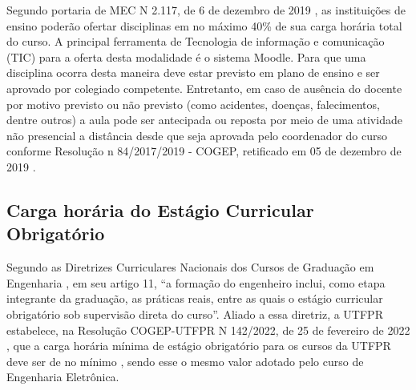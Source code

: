 

Segundo portaria de MEC N\textordmasculine{} 2.117, de 6 de dezembro de 2019 \cite{portaria2117mec}, as instituições de ensino poderão ofertar disciplinas em no máximo 40\% de sua carga horária total do curso. A principal ferramenta de Tecnologia de informação e comunicação (TIC) para a oferta desta modalidade é o sistema Moodle. Para que uma disciplina ocorra desta maneira deve estar previsto em plano de ensino e ser aprovado por colegiado competente. Entretanto, em caso de ausência do docente por motivo previsto ou não previsto (como acidentes, doenças, falecimentos, dentre outros) a aula pode ser antecipada ou reposta por meio de uma atividade não presencial a distância desde que seja aprovada pelo coordenador do curso conforme Resolução n\textordmasculine{} 84/2017/2019 - COGEP, retificado em 05 de dezembro de 2019 \cite{cogep84}.


\subsection{Carga horária do Estágio Curricular Obrigatório}

Segundo as Diretrizes Curriculares Nacionais dos Cursos de Graduação em Engenharia \cite{dcneng}, em seu artigo 11, ``a formação  do  engenheiro  inclui,  como  etapa  integrante da  graduação, as práticas reais, entre as quais o estágio curricular obrigatório sob supervisão direta do curso''. Aliado a essa diretriz, a UTFPR estabelece, na Resolução COGEP-UTFPR N\textordmasculine{} 142/2022, de 25 de fevereiro de 2022 \cite{cogep142}, que a carga horária mínima de estágio obrigatório para os cursos da UTFPR deve ser de no mínimo \the\value{horasEST}, sendo esse o mesmo valor adotado pelo curso de Engenharia Eletrônica.

